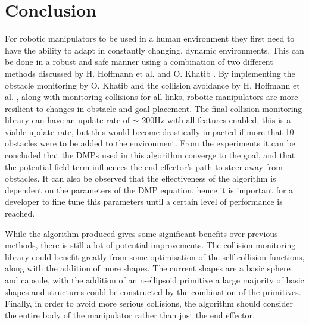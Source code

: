 \documentclass[a4paper, 10pt, conference]{ieeeconf}      %
\begin{document}
\section{Conclusion}
For robotic manipulators to be used in a human environment they first need to have the ability to adapt in constantly changing, dynamic environments. This can be done in a robust and safe manner using a combination of two different methods discussed by H. Hoffmann et al. \cite{Hoffmann} and O. Khatib \cite{Khatib}. By implementing the obstacle monitoring by O. Khatib \cite{Khatib} and the collision avoidance by H. Hoffmann et al. \cite{Hoffmann}, along with monitoring collisions for all links, robotic manipulators are more resilient to changes in obstacle and goal placement. The final collision monitoring library can have an update rate of $\sim$ 200Hz with all features enabled, this is a viable update rate, but this would become drastically impacted if more that 10 obstacles were to be added to the environment. %
From the experiments it can be concluded that the DMPs used in this algorithm converge to the goal, and that the potential field term influences the end effector's path to steer away from obstacles. 
It can also be observed that the effectiveness of the algorithm is dependent on the parameters of the DMP equation, hence it is important for a developer to fine tune this parameters until a certain level of performance is reached.
 
While the algorithm produced gives some significant benefits over previous methods, there is still a lot of potential improvements. The collision monitoring library could benefit greatly from some optimisation of the self collision functions, along with the addition of more shapes. The current shapes are a basic sphere and capsule, with the addition of an n-ellipsoid primitive a large majority of basic shapes and structures could be constructed by the combination of the primitives. %
Finally, in order to avoid more serious collisions, the algorithm should consider the entire body of the manipulator rather than just the end effector. 



\addtolength{\textheight}{-12cm}   %
\end{document}
